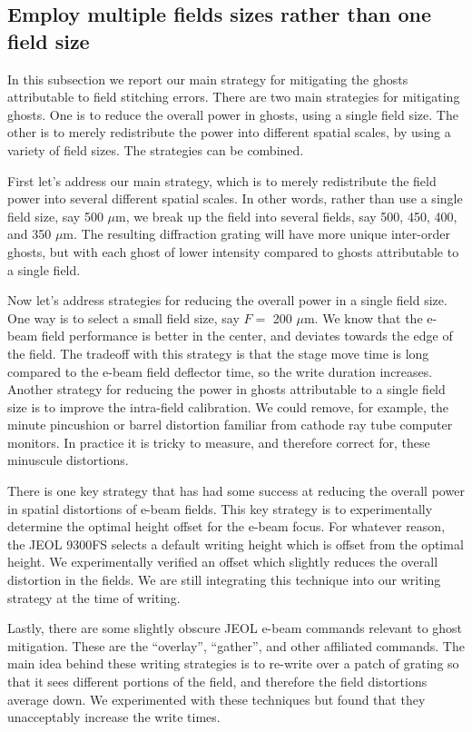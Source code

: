 \documentclass[]{spie}  %
\begin{document}
\subsection{Employ multiple fields sizes rather than one field size}
\label{sec:MultipleFields}
In this subsection we report our main strategy for mitigating the ghosts attributable to field stitching errors.  There are two main strategies for mitigating ghosts.  One is to reduce the overall power in ghosts, using a single field size.  The other is to merely redistribute the power into different spatial scales, by using a variety of field sizes.  The strategies can be combined.

First let's address our main strategy, which is to merely redistribute the field power into several different spatial scales.  In other words, rather than use a single field size, say 500 $\mu$m, we break up the field into several fields, say 500, 450, 400, and 350 $\mu$m.  The resulting diffraction grating will have more unique inter-order ghosts, but with each ghost of lower intensity compared to ghosts attributable to a single field.

Now let's address strategies for reducing the overall power in a single field size.  One way is to select a small field size, say $F=$ 200 $\mu$m.   We know that the e-beam field performance is better in the center, and deviates towards the edge of the field.  The tradeoff with this strategy is that the stage move time is long compared to the e-beam field deflector time, so the write duration increases.  Another strategy for reducing the power in ghosts attributable to a single field size is to improve the intra-field calibration.   We could remove, for example, the minute pincushion or barrel distortion familiar from cathode ray tube computer monitors.  In practice it is tricky to measure, and therefore correct for, these minuscule distortions.

There is one key strategy that has had some success at reducing the overall power in spatial distortions of e-beam fields.  This key strategy is to experimentally determine the optimal height offset for the e-beam focus.  For whatever reason, the JEOL 9300FS selects a default writing height which is offset from the optimal height.  We experimentally verified an offset which slightly reduces the overall distortion in the fields.  We are still integrating this technique into our writing strategy at the time of writing.

Lastly, there are some slightly obscure JEOL e-beam commands relevant to ghost mitigation.  These are the ``overlay'', ``gather'', and other affiliated commands.  The main idea behind these writing strategies is to re-write over a patch of grating so that it sees different portions of the field, and therefore the field distortions average down.  We experimented with these techniques but found that they unacceptably increase the write times.
\end{document}
